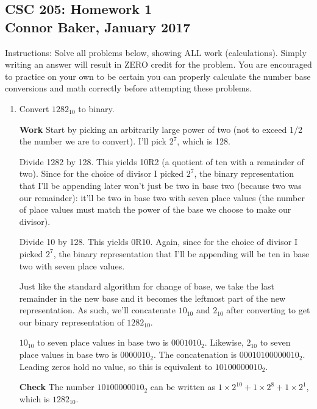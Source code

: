 \documentclass[12pt]{article}
\begin{document}
\begin{center}
\subsection*{CSC 205: Homework 1\\Connor Baker, January 2017}
\end{center}
Instructions:  Solve all problems below, showing ALL work (calculations).  Simply writing an answer will result in ZERO credit for the problem.  You are encouraged to practice on your own to be certain you can properly calculate the number base conversions and math correctly before attempting these problems.\\

\begin{enumerate}
\item Convert $1282_{10}$ to binary.
\end{enumerate}

\begin{enumerate}
  \item[\textbf{Work}] Start by picking an arbitrarily large power of two (not to exceed 1/2 the number we are to convert). I'll pick $2^7$, which is 128.
  \item[] Divide 1282 by 128. This yields 10R2 (a quotient of ten with a remainder of two). Since for the choice of divisor I picked $2^7$, the binary representation that I'll be appending later won't just be two in base two (because two was our remainder): it'll be two in base two with seven place values (the number of place values must match the power of the base we choose to make our divisor).
  \item[] Divide 10 by 128. This yields 0R10. Again, since for the choice of divisor I picked $2^7$, the binary representation that I'll be appending  will be ten in base two with seven place values.
  \item[] Just like the standard algorithm for change of base, we take the last remainder in the new base and it becomes the leftmost part of the new representation. As such, we'll concatenate $10_10$ and $2_10$ after converting to get our binary representation of $1282_{10}$.
  \item[] $10_{10}$ to seven place values in base two is $0001010_2$. Likewise, $2_{10}$ to seven place values in base two is $0000010_2$. The concatenation is $00010100000010_2$. Leading zeros hold no value, so this is equivalent to $10100000010_2$.
  \item[\textbf{Check}] The number $10100000010_2$ can be written as $1\times2^{10}+1\times2^8+1\times2^1$, which is $1282_{10}$.
\end{enumerate}
\end{document}
